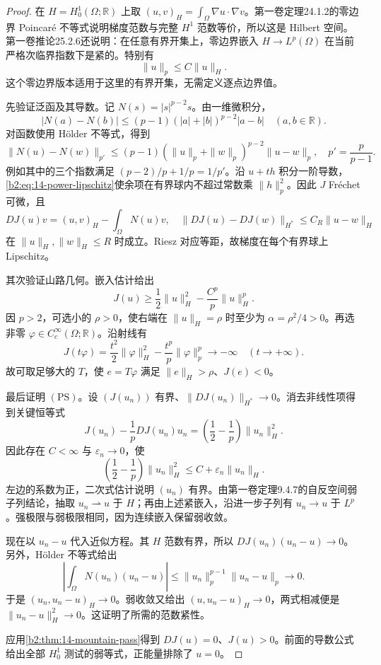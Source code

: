 \begin{proof}
在 \(H=H_0^1(\Omega;\mathbb R)\) 上取
\((u,v)_H=\int_\Omega\nabla u\cdot\nabla v\)。第一卷定理24.1.2的零边界 Poincaré 不等式说明梯度范数与完整 \(H^1\) 范数等价，所以这是 Hilbert 空间。第一卷推论25.2.6还说明：在任意有界开集上，零边界嵌入 \(H\to L^p(\Omega)\) 在当前严格次临界指数下是紧的。特别有
\[
 \|u\|_p\le C\|u\|_H.
\]
这个零边界版本适用于这里的有界开集，无需定义逐点边界值。

先验证泛函及其导数。记 \(N(s)=|s|^{p-2}s\)。由一维微积分，
\[
 |N(a)-N(b)|\le(p-1)(|a|+|b|)^{p-2}|a-b|
 \quad(a,b\in\mathbb R).
\]
对函数使用 Hölder 不等式，得到
\begin{equation}\label{b2:eq:14-power-lipschitz}
 \|N(u)-N(w)\|_{p'}
 \le(p-1)(\|u\|_p+\|w\|_p)^{p-2}\|u-w\|_p,
 \quad p'=\frac p{p-1}.
\end{equation}
例如其中的三个指数满足 \((p-2)/p+1/p=1/p'\)。沿 \(u+th\) 积分一阶导数，\eqref{b2:eq:14-power-lipschitz}使余项在有界球内不超过常数乘 \(\|h\|_p^2\)。因此 \(J\) Fréchet 可微，且
\[
 DJ(u)v=(u,v)_H-\int_\Omega N(u)v,
 \quad
 \|DJ(u)-DJ(w)\|_{H^*}\le C_R\|u-w\|_H
\]
在 \(\|u\|_H,\|w\|_H\le R\) 时成立。Riesz 对应等距，故梯度在每个有界球上 Lipschitz。

其次验证山路几何。嵌入估计给出
\[
 J(u)\ge\frac12\|u\|_H^2-\frac{C^p}{p}\|u\|_H^p.
\]
因 \(p>2\)，可选小的 \(\rho>0\)，使右端在 \(\|u\|_H=\rho\) 时至少为 \(\alpha=\rho^2/4>0\)。再选非零 \(\varphi\in C_c^\infty(\Omega;\mathbb R)\)。沿射线有
\[
 J(t\varphi)=\frac{t^2}2\|\varphi\|_H^2
                  -\frac{t^p}p\|\varphi\|_p^p\longrightarrow-\infty
 \quad(t\to+\infty).
\]
故可取足够大的 \(T\)，使 \(e=T\varphi\) 满足 \(\|e\|_H>\rho\)、\(J(e)<0\)。

最后证明 \((\mathrm{PS})\)。设 \((J(u_n))\) 有界、\(\|DJ(u_n)\|_{H^*}\to0\)。消去非线性项得到关键恒等式
\[
 J(u_n)-\frac1pDJ(u_n)u_n
       =\left(\frac12-\frac1p\right)\|u_n\|_H^2.
\]
因此存在 \(C<\infty\) 与 \(\varepsilon_n\to0\)，使
\[
 \left(\frac12-\frac1p\right)\|u_n\|_H^2
       \le C+\varepsilon_n\|u_n\|_H.
\]
左边的系数为正，二次式估计说明 \((u_n)\) 有界。由第一卷定理9.4.7的自反空间弱子列结论，抽取 \(u_n\rightharpoonup u\) 于 \(H\)；再由上述紧嵌入，沿进一步子列有 \(u_n\to u\) 于 \(L^p\)。强极限与弱极限相同，因为连续嵌入保留弱收敛。

现在以 \(u_n-u\) 代入近似方程。其 \(H\) 范数有界，所以
\(DJ(u_n)(u_n-u)\to0\)。另外，Hölder 不等式给出
\[
 \left|\int_\Omega N(u_n)(u_n-u)\right|
 \le\|u_n\|_p^{p-1}\|u_n-u\|_p\longrightarrow0.
\]
于是 \((u_n,u_n-u)_H\to0\)。弱收敛又给出 \((u,u_n-u)_H\to0\)，两式相减便是
\(\|u_n-u\|_H^2\to0\)。这证明了所需的范数紧性。

应用\cref{b2:thm:14-mountain-pass}得到 \(DJ(u)=0\)、\(J(u)>0\)。前面的导数公式给出全部 \(H_0^1\) 测试的弱等式，正能量排除了 \(u=0\)。
\end{proof}

